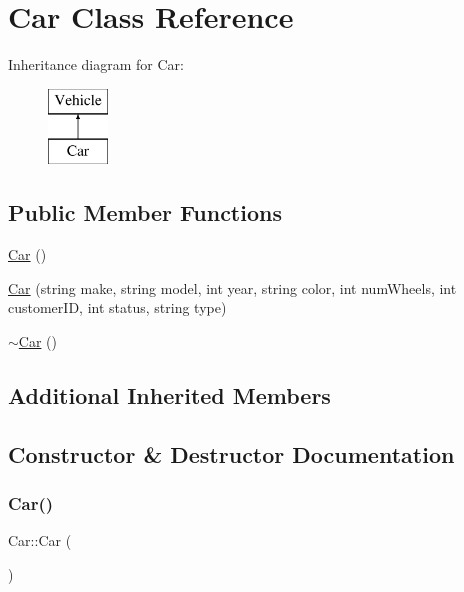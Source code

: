 \hypertarget{class_car}{}\section{Car Class Reference}
\label{class_car}
Inheritance diagram for Car\+:\begin{figure}[H]
\begin{center}
\leavevmode
\includegraphics[height=2.000000cm]{class_car}
\end{center}
\end{figure}
\subsection*{Public Member Functions}
\begin{DoxyCompactItemize}
\item 
\hyperlink{class_car_a1c803f7c5038d3e31b368b0d0a35493c}{Car} ()
\item 
\hyperlink{class_car_a618f4d3c9a4edd09cb6477db71266fdd}{Car} (string make, string model, int year, string color, int num\+Wheels, int customer\+ID, int status, string type)
\item 
\hyperlink{class_car_a5933bb06e96b159fe339a128abda888a}{$\sim$\+Car} ()
\end{DoxyCompactItemize}
\subsection*{Additional Inherited Members}


\subsection{Constructor \& Destructor Documentation}
\mbox{\label{class_car_a1c803f7c5038d3e31b368b0d0a35493c}} 
\subsubsection{\texorpdfstring{Car()}{Car()}\hspace{0.1cm}{\footnotesize\ttfamily [1/2]}}
{\footnotesize\ttfamily Car\+::\+Car (\begin{DoxyParamCaption}{ }\end{DoxyParamCaption})}

